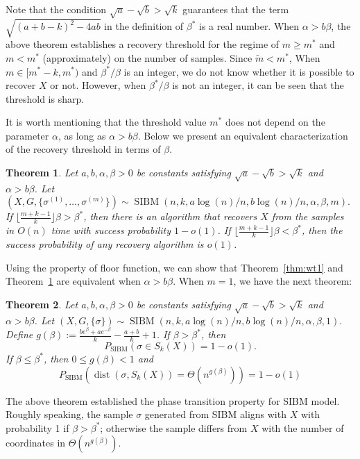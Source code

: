 \documentclass[conference]{IEEEtran}
\newtheorem{theorem}{Theorem}%
\DeclareMathOperator{\SIBM}{SIBM}
\DeclareMathOperator{\dist}{dist}
\begin{document}
Note that the condition $\sqrt{a}-\sqrt{b} > \sqrt{k}$ guarantees that the term $\sqrt{(a+b-k)^2-4ab}$ in the definition of $\beta^\ast$ is a real number.
When $\alpha > b \beta$,
the above theorem establishes a recovery threshold
for the regime of $m \geq m^\ast$ and $m < m^\ast$ (approximately) on the number of samples. Since $\tilde{m} < m^*$,
When $m \in [m^* - k, m^\ast)$ and $\beta^\ast/\beta$ is an integer, we do not know whether it is possible to recover $X$ or not.
However, when $\beta^\ast/\beta$ is not an integer, it can be seen that the threshold is sharp.

It is worth mentioning that the threshold value $m^\ast$ does not depend on the parameter $\alpha$, as long as $\alpha>b\beta$.
Below we present an equivalent characterization of the recovery threshold in terms of $\beta$.
\begin{theorem} \label{thm:wt2}
	Let $a,b,\alpha,\beta> 0$ be constants satisfying $\sqrt{a}-\sqrt{b} > \sqrt{k}$ and $\alpha>b\beta$. 
	Let 
	$
	(X,G,\{\sigma^{(1)},\dots,\sigma^{(m)}\}) \sim \SIBM(n, k, a\log(n)/n, b\log(n)/n,\alpha,\beta,m).
	$
	If $\lfloor \frac{m+k-1}{k} \rfloor \beta>\beta^\ast$,
	then there is an algorithm that recovers $X$ from the samples in $O(n)$ time with success probability $1-o(1)$.
	If $\lfloor \frac{m+k-1}{k} \rfloor \beta <\beta^\ast$, then the success probability of any recovery algorithm is $o(1)$. 
\end{theorem}
Using the property of floor function, we can show that Theorem~\ref{thm:wt1} and Theorem~\ref{thm:wt2} are equivalent when $\alpha > b \beta$.
When $m=1$, we have the next theorem:

\begin{theorem}  \label{thm:wt3}
Let $a,b,\alpha,\beta> 0$ be constants satisfying $\sqrt{a}-\sqrt{b} > \sqrt{k}$ and $\alpha>b\beta$.
Let 
$
(X,G,\{\sigma\}) \sim \SIBM(n,k, a\log(n)/n, b\log(n)/n,\alpha,\beta,1).
$
Define $g(\beta)  := \frac{b e^{\beta}+a e^{-\beta}}{k}-\frac{a+b}{k}+1$.
If $\beta>\beta^\ast$, then
$$
P_{\SIBM}(\sigma \in S_k(X)) = 1-o(1).
$$
If $\beta\le \beta^\ast$, then $0\leq g(\beta) < 1$ and
$$
P_{\SIBM}(\dist(\sigma, S_k(X))= \Theta(n^{g(\beta)})) = 1-o(1)
$$
\end{theorem}

The above theorem established the phase transition property for SIBM model.
Roughly speaking, the sample $\sigma$ generated from SIBM aligns with $X$ with probability 1 if $\beta > \beta^*$;
otherwise the sample differs from $X$ with the number of coordinates in $\Theta(n^{g(\beta)})$.
\end{document}
